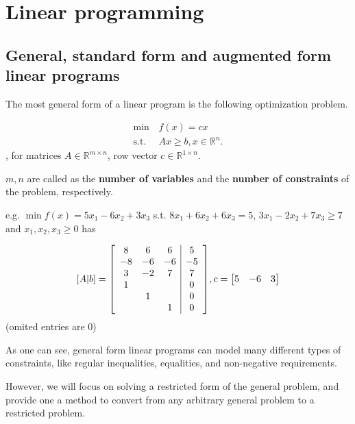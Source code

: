 \chapter{Linear programming} %
\label{chap:Linear programming}
\section{General, standard form and augmented form linear programs} %
\label{sec:General, standard form and augmented form linear programs}

The most general form of a linear program is the following optimization problem.

\begin{align*}
  \min\, &f(x) = cx\\
  \text{s.t.}\, & Ax\ge b, x \in \mathbb{R}^{n}
.\end{align*}, for matrices \( A \in \mathbb{R}^{m \times n}\), row vector
\(c \in \mathbb{R}^{ 1\times  n} \).

\( m, n \) are called as the \textbf{number of variables} and the \textbf{number
of constraints} of the problem, respectively.

e.g. $\min f(x)=5x_{1}-6x_{2}+3x_{3}$ s.t. $8x_{1}+6x_{2}+6x_{3}=5$, $3x_{1}-2x_{2}+7x_{3}\geq 7$ and $x_{1},x_{2},x_{3}\geq 0$ has

\renewcommand\arraystretch{1.3}

\[
  [A|b]=\mleft[
  \begin{array}{ccc|c}
8 & 6 & 6 & 5 \\
-8 & -6 & -6 & -5 \\
3 & -2 & 7 & 7 \\
1 &  &  & 0 \\
 & 1 &  & 0 \\
	 &  & 1 & 0 \\
   \end{array}
   \mright], c=\begin{bmatrix}
5 & -6 & 3
\end{bmatrix}
\] (omited entries are \( 0 \))

As one can see, general form linear programs can model many different types of
constraints, like regular inequalities, equalities, and non-negative
requirements.

However, we will focus on solving a restricted form of the general problem, and
provide one a method to convert from any arbitrary general problem to a
restricted problem.

